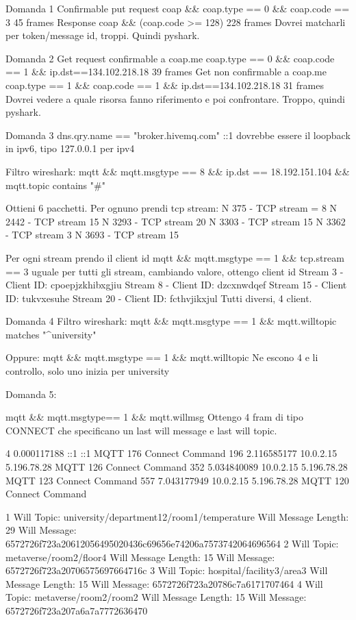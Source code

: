 Domanda 1
Confirmable put request 
coap \&\& coap.type == 0 \&\& coap.code == 3
45 frames
Response 
coap \&\& (coap.code >= 128)
228 frames 
Dovrei matcharli per token/message id, troppi.
Quindi pyshark.

Domanda 2
Get request confirmable a coap.me
coap.type == 0 \&\& coap.code == 1 \&\& ip.dst==134.102.218.18
39 frames
Get non confirmable a coap.me
coap.type == 1 \&\& coap.code == 1 \&\& ip.dst==134.102.218.18
31 frames
Dovrei vedere a quale risorsa fanno riferimento e poi confrontare.
Troppo, quindi pyshark.

Domanda 3
dns.qry.name == "broker.hivemq.com"
::1 dovrebbe essere il loopback in ipv6, tipo 127.0.0.1 per ipv4

Filtro wireshark:
mqtt \&\& mqtt.msgtype == 8 \&\& ip.dst == 18.192.151.104 \&\& mqtt.topic contains "#"

Ottieni 6 pacchetti.
Per ognuno prendi tcp stream:
N 375 - TCP stream = 8
N 2442 - TCP stream 15
N 3293 - TCP stream 20
N 3303 - TCP stream 15
N 3362 - TCP stream 3 
N 3693 - TCP stream 15 

Per ogni stream prendo il client id 
mqtt \&\& mqtt.msgtype == 1 \&\& tcp.stream == 3 
uguale per tutti gli stream, cambiando valore, ottengo client id 
Stream 3 - Client ID: cpoepjzkhibxgjiu
Stream 8 - Client ID: dzcxnwdqef
Stream 15 - Client ID: tukvxesuhe
Stream 20 - Client ID: fcthvjikxjul
Tutti diversi, 4 client.

Domanda 4
Filtro wireshark:
mqtt \&\& mqtt.msgtype == 1 \&\& mqtt.willtopic matches "^university"

Oppure:
mqtt \&\& mqtt.msgtype == 1 \&\& mqtt.willtopic
Ne escono 4 e li controllo, solo uno inizia per university 

Domanda 5:

mqtt \&\& mqtt.msgtype== 1 \&\& mqtt.willmsg
Ottengo 4 fram di tipo CONNECT che specificano un last will message e last will topic.

4	0.000117188	::1	::1	MQTT	176	Connect Command
196	2.116585177	10.0.2.15	5.196.78.28	MQTT	126	Connect Command
352	5.034840089	10.0.2.15	5.196.78.28	MQTT	123	Connect Command
557	7.043177949	10.0.2.15	5.196.78.28	MQTT	120	Connect Command

1
Will Topic: university/department12/room1/temperature
Will Message Length: 29
Will Message: 6572726f723a20612056495020436c69656e74206a7573742064696564
2
Will Topic: metaverse/room2/floor4
Will Message Length: 15
Will Message: 6572726f723a20706575697664716c
3
Will Topic: hospital/facility3/area3
Will Message Length: 15
Will Message: 6572726f723a20786c7a6171707464
4
Will Topic: metaverse/room2/room2
Will Message Length: 15
Will Message: 6572726f723a207a6a7a7772636470

